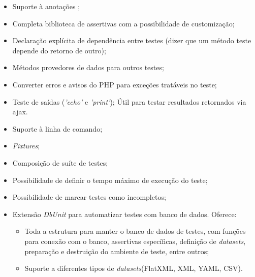     \begin{itemize}
      \item Suporte à anotações \footnotemark ;
		      
      \item Completa biblioteca de assertivas com a possibilidade de customização;
	
      \item Declaração explícita de dependência entre testes (dizer que um método teste depende do retorno de outro);
      
      \item Métodos provedores de dados para outros testes;
      
      \item Converter erros e avisos do PHP para exceções tratáveis no teste;
      
      \item Teste de saídas (\textit{'echo'} e \textit{'print'});
	\subitem Útil para testar resultados retornados via ajax.
	
      \item Suporte à linha de comando;
      
      \item \textit{Fixtures};
      
      \item Composição de suíte de testes;
      
      \item Possibilidade de definir o tempo máximo de execução do teste;
      
      \item Possibilidade de marcar testes como incompletos;
      
      \item Extensão \textit{DbUnit} para automatizar testes com banco de dados. Oferece:
	\begin{itemize}
	 \item Toda a estrutura para manter o banco de dados de testes, com funções para conexão
		com o banco, assertivas específicas, definição de \textit{datasets}, preparação
		e destruição do ambiente de teste, entre outros;
	 \item Suporte a diferentes tipos de \textit{datasets}(FlatXML, XML, YAML, CSV).
	\end{itemize}
      

\end{itemize}
